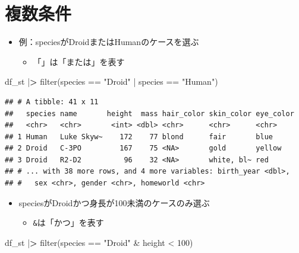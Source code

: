 \documentclass[
  xelatex,ja=standard, b5paper]{bxjsbook}
\newenvironment{Shaded}{\begin{snugshade}}{\end{snugshade}}
\newcommand{\DecValTok}[1]{\textcolor[rgb]{0.00,0.00,0.81}{#1}}
\newcommand{\ErrorTok}[1]{\textcolor[rgb]{0.64,0.00,0.00}{\textbf{#1}}}
\newcommand{\FunctionTok}[1]{\textcolor[rgb]{0.00,0.00,0.00}{#1}}
\newcommand{\NormalTok}[1]{#1}
\newcommand{\SpecialCharTok}[1]{\textcolor[rgb]{0.00,0.00,0.00}{#1}}
\newcommand{\StringTok}[1]{\textcolor[rgb]{0.31,0.60,0.02}{#1}}
\providecommand{\tightlist}{%
  \setlength{\itemsep}{0pt}\setlength{\parskip}{0pt}}
\begin{document}
\hypertarget{filter-multi}{%
\section{複数条件}\label{filter-multi}}

\begin{itemize}
\tightlist
\item
  例：speciesがDroidまたはHumanのケースを選ぶ

  \begin{itemize}
  \tightlist
  \item
    「\texttt{\textbar{}}」は「または」を表す
  \end{itemize}
\end{itemize}

\begin{Shaded}
\begin{Highlighting}[]
\NormalTok{df\_st }\SpecialCharTok{|}\ErrorTok{\textgreater{}} 
  \FunctionTok{filter}\NormalTok{(species }\SpecialCharTok{==} \StringTok{"Droid"} \SpecialCharTok{|}\NormalTok{ species }\SpecialCharTok{==} \StringTok{"Human"}\NormalTok{)}
\end{Highlighting}
\end{Shaded}

\begin{verbatim}
## # A tibble: 41 x 11
##   species name       height  mass hair_color skin_color eye_color
##   <chr>   <chr>       <int> <dbl> <chr>      <chr>      <chr>    
## 1 Human   Luke Skyw~    172    77 blond      fair       blue     
## 2 Droid   C-3PO         167    75 <NA>       gold       yellow   
## 3 Droid   R2-D2          96    32 <NA>       white, bl~ red      
## # ... with 38 more rows, and 4 more variables: birth_year <dbl>,
## #   sex <chr>, gender <chr>, homeworld <chr>
\end{verbatim}

\begin{itemize}
\tightlist
\item
  speciesがDroidかつ身長が100未満のケースのみ選ぶ

  \begin{itemize}
  \tightlist
  \item
    \texttt{\&}は「かつ」を表す
  \end{itemize}
\end{itemize}

\begin{Shaded}
\begin{Highlighting}[]
\NormalTok{df\_st }\SpecialCharTok{|}\ErrorTok{\textgreater{}} 
  \FunctionTok{filter}\NormalTok{(species }\SpecialCharTok{==} \StringTok{"Droid"} \SpecialCharTok{\&}\NormalTok{ height }\SpecialCharTok{\textless{}} \DecValTok{100}\NormalTok{)}
\end{Highlighting}
\end{Shaded}
\end{document}

